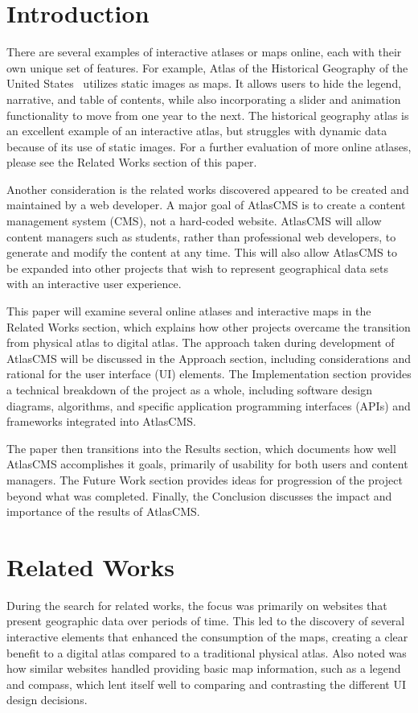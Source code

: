 \documentclass[11pt, final, conference, twocolumn]{IEEEtran}
\begin{document}
\IEEEpeerreviewmaketitle

\section{Introduction}

There are several examples of interactive atlases or maps online, each with their own unique set of features. For example, Atlas of the Historical Geography of the United States~\cite{us-historical-atlas-2014} utilizes static images as maps.  It allows users to hide the legend, narrative, and table of contents, while also incorporating a slider and animation functionality to move from one year to the next.  The historical geography atlas is an excellent example of an interactive atlas, but struggles with dynamic data because of its use of static images. For a further evaluation of more online atlases, please see the Related Works section of this paper.

Another consideration is the related works discovered appeared to be created and maintained by a web developer. A major goal of AtlasCMS is to create a content management system (CMS), not a hard-coded website. AtlasCMS will allow content managers such as students, rather than professional web developers, to generate and modify the content at any time. This will also allow AtlasCMS to be expanded into other projects that wish to represent geographical data sets with an interactive user experience.

This paper will examine several online atlases and interactive maps in the Related Works section, which explains how other projects overcame the transition from physical atlas to digital atlas. The approach taken during development of AtlasCMS will be discussed in the Approach section, including considerations and rational for the user interface (UI) elements. The Implementation section provides a technical breakdown of the project as a whole, including software design diagrams, algorithms, and specific application programming interfaces (APIs) and frameworks integrated into AtlasCMS.

The paper then transitions into the Results section, which documents how well AtlasCMS accomplishes it goals, primarily of usability for both users and content managers. The Future Work section provides ideas for progression of the project beyond what was completed. Finally, the Conclusion discusses the impact and importance of the results of AtlasCMS.

\section{Related Works}
During the search for related works, the focus was primarily on websites that present geographic data over periods of time. This led to the discovery of several interactive elements that enhanced the consumption of the maps, creating a clear benefit to a digital atlas compared to a traditional physical atlas. Also noted was how similar websites handled providing basic map information, such as a legend and compass, which lent itself well to comparing and contrasting the different UI design decisions.
\end{document}
